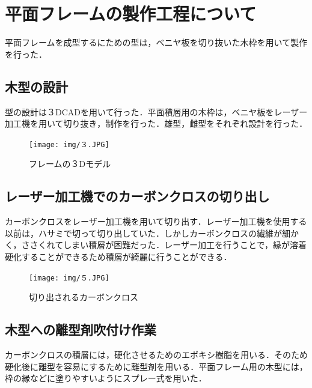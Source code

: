 \chapter{平面フレームの製作工程について}

平面フレームを成型するにための型は，ベニヤ板を切り抜いた木枠を用いて製作を行った．

\section{木型の設計}
型の設計は３DCADを用いて行った．平面積層用の木枠は，ベニヤ板をレーザー加工機を用いて切り抜き，制作を行った．雄型，雌型をそれぞれ設計を行った．

\begin{figure}[htbp]
  \begin{center}
    \texttt{[image: img/３.JPG]}
    \end{center}
  \caption{フレームの３Dモデル}
 \label{fig:robot}
\end{figure}

\section{レーザー加工機でのカーボンクロスの切り出し}
カーボンクロスをレーザー加工機を用いて切り出す．レーザー加工機を使用する以前は，ハサミで切って切り出していた．しかしカーボンクロスの繊維が細かく，ささくれてしまい積層が困難だった．レーザー加工を行うことで，縁が溶着硬化することができるため積層が綺麗に行うことができる．

\begin{figure}[htbp]
  \begin{center}
    \texttt{[image: img/５.JPG]}
    \end{center}
  \caption{切り出されるカーボンクロス}
 \label{fig:robot}
\end{figure}


\section{木型への離型剤吹付け作業}
カーボンクロスの積層には，硬化させるためのエポキシ樹脂を用いる．そのため硬化後に離型を容易にするために離型剤を用いる．平面フレーム用の木型には，枠の縁などに塗りやすいようにスプレー式を用いた．

